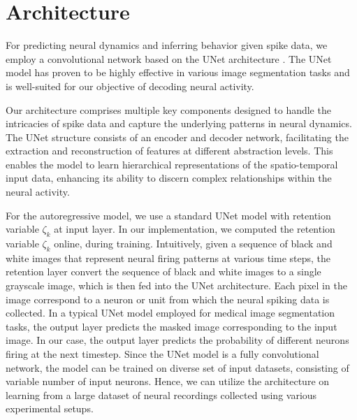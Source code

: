\section{Architecture}

For predicting neural dynamics and inferring behavior given spike data, we employ a convolutional network based on the UNet architecture \cite{ronneberger2015u}. The UNet model has proven to be highly effective in various image segmentation tasks and is well-suited for our objective of decoding neural activity.

Our architecture comprises multiple key components designed to handle the intricacies of spike data and capture the underlying patterns in neural dynamics. The UNet structure consists of an encoder and decoder network, facilitating the extraction and reconstruction of features at different abstraction levels. This enables the model to learn hierarchical representations of the spatio-temporal input data, enhancing its ability to discern complex relationships within the neural activity.

For the autoregressive model, we use a standard UNet model with retention variable $\zeta_k$ at input layer. In our implementation, we computed the retention variable $\zeta_k$ online, during training. Intuitively, given a sequence of black and white images that represent neural firing patterns at various time steps, the retention layer convert the sequence of black and white images to a single grayscale image, which is then fed into the UNet architecture. Each pixel in the image correspond to a neuron or unit from which the neural spiking data is collected. 
In a typical UNet model employed for medical image segmentation tasks, the output layer predicts the masked image corresponding to the input image. In our case, the output layer predicts the probability of different neurons firing at the next timestep. Since the UNet model is a fully convolutional network, the model can be trained on diverse set of input datasets, consisting of variable number of input neurons. Hence, we can utilize the architecture on learning from a large dataset of neural recordings collected using various experimental setups.  \\



